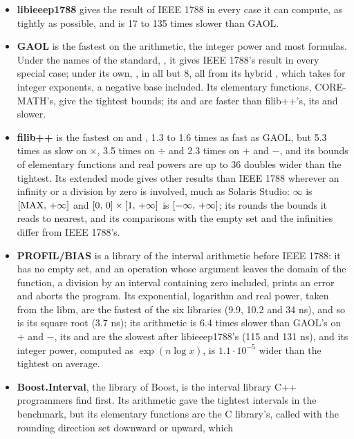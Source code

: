 \documentclass[12pt,a4paper,twoside,openright]{book}
\begin{document}
\begin{itemize}
\item[$\bullet$] \textbf{libieeep1788} gives the result of IEEE 1788 in
every case it can compute, as tightly as possible, and is 17 to 135 times
slower than GAOL.
\item[$\bullet$] \textbf{GAOL} is the fastest on the arithmetic, the
integer power and most formulas. Under the names of the standard,
, it gives IEEE 1788's result in every special case;
under its own, , in all but 8, all from its hybrid ,
which takes  for integer exponents, a negative base included. Its
elementary functions, CORE-MATH's, give the tightest bounds; its 
and  are faster than filib++'s, its  and 
slower.
\item[$\bullet$] \textbf{filib++} is the fastest on  and
, 1.3 to 1.6 times as fast as GAOL, but 5.3 times as slow on
$\times$, 3.5 times on $\div$ and 2.3 times on $+$ and $-$, and its bounds
of elementary functions and real powers are up to 36 doubles wider than the
tightest. Its extended mode gives other results than IEEE 1788 wherever an
infinity or a division by zero is involved, much as Solaris Studio:
$\infty$\code{)} is $[\mathrm{MAX},\,+\infty]$ and
$[0,\,0] \times [1,\,+\infty]$ is $[-\infty,\,+\infty]$; its
 rounds the bounds it reads to nearest, and its
comparisons with the empty set and the infinities differ from IEEE 1788's.
\item[$\bullet$] \textbf{PROFIL/BIAS} is a library of the interval
arithmetic before IEEE 1788: it has no empty set, and an operation whose
argument leaves the domain of the function, a division by an interval
containing zero included, prints an error and aborts the program. Its
exponential, logarithm and real power, taken from the libm, are the fastest
of the six libraries (9.9, 10.2 and 34 ns), and so is its square root (3.7 ns); its
arithmetic is 6.4 times slower than GAOL's on $+$ and $-$, its 
and  are the slowest after libieeep1788's (115 and 131 ns), and
its integer power, computed as $\exp(n \log x)$, is $1.1\cdot10^{-5}$ wider
than the tightest on average.
\item[$\bullet$] \textbf{Boost.Interval}, the library of Boost, is the
interval library C++ programmers find first. Its arithmetic gave the
tightest intervals in the benchmark, but its elementary functions are the C
library's, called with the rounding direction set downward or upward, which

\end{itemize}
\end{document}
